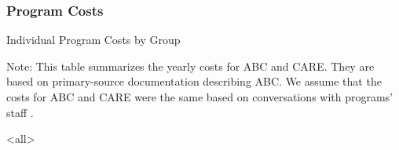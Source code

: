 \documentclass[static]{JJH-Beamer}
\newcommand{\backupend}{
   \setcounter{framenumber}{\value{finalframe}}
}
\begin{document}

\begin{frame}

\frametitle{Program Costs}



\begin{table}

\begin{center}

\caption{Individual Program Costs by Group}

\scalebox{.7}{
}

\end{center}

\end{table}

{\tiny\flushleft Note: This table summarizes the yearly costs for ABC and CARE. They are based on primary-source documentation describing ABC. We assume that the costs for ABC and CARE were the same based on conversations with programs' staff \citet{projectcare2014interviews,abc2014-2015interviews}.}

\hyperlink{costs}{}		

\end{frame}
\backupend



\mode<all>

\savebox\hiddenbib{\parbox{\textwidth}{}}
\end{document}
